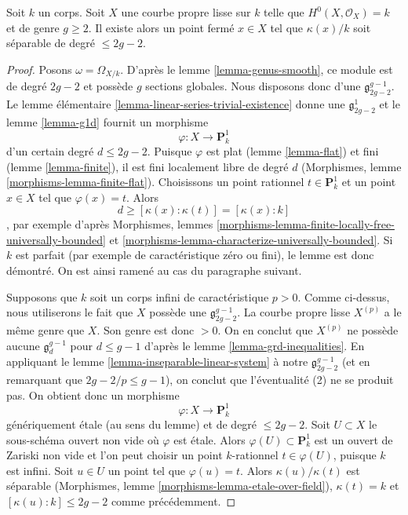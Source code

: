 \begin{lemma}
\label{lemma-point-over-separable-extension}
Soit $k$ un corps. Soit $X$ une courbe propre lisse sur $k$ telle que $H^0(X, \mathcal{O}_X) = k$ et de genre $g \geq 2$. Il existe alors un point fermé $x \in X$ tel que $\kappa(x)/k$ soit séparable de degré $\leq 2g - 2$.
\end{lemma}

\begin{proof}
Posons $\omega = \Omega_{X/k}$. D'après le lemme \ref{lemma-genus-smooth}, ce module est de degré $2g - 2$ et possède $g$ sections globales. Nous disposons donc d'une $\mathfrak g^{g - 1}_{2g - 2}$. Le lemme élémentaire \ref{lemma-linear-series-trivial-existence} donne une $\mathfrak g^1_{2g - 2}$ et le lemme \ref{lemma-g1d} fournit un morphisme $$
\varphi : X \longrightarrow \mathbf{P}^1_k
$$ d'un certain degré $d \leq 2g - 2$. Puisque $\varphi$ est plat (lemme \ref{lemma-flat}) et fini (lemme \ref{lemma-finite}), il est fini localement libre de degré $d$ (Morphismes, lemme \ref{morphisms-lemma-finite-flat}). Choisissons un point rationnel $t \in \mathbf{P}^1_k$ et un point $x \in X$ tel que $\varphi(x) = t$. Alors $$
d \geq [\kappa(x) : \kappa(t)] = [\kappa(x) : k]
$$, par exemple d'après Morphismes, lemmes \ref{morphisms-lemma-finite-locally-free-universally-bounded} et \ref{morphisms-lemma-characterize-universally-bounded}. Si $k$ est parfait (par exemple de caractéristique zéro ou fini), le lemme est donc démontré. On est ainsi ramené au cas du paragraphe suivant.

\medskip\noindent
Supposons que $k$ soit un corps infini de caractéristique $p > 0$. Comme ci-dessus, nous utiliserons le fait que $X$ possède une $\mathfrak g^{g - 1}_{2g - 2}$. La courbe propre lisse $X^{(p)}$ a le même genre que $X$. Son genre est donc $> 0$. On en conclut que $X^{(p)}$ ne possède aucune $\mathfrak g^{g - 1}_d$ pour $d \leq g - 1$ d'après le lemme \ref{lemma-grd-inequalities}. En appliquant le lemme \ref{lemma-inseparable-linear-system} à notre $\mathfrak g^{g - 1}_{2g - 2}$ (et en remarquant que $2g - 2/p \leq g - 1$), on conclut que l'éventualité (2) ne se produit pas. On obtient donc un morphisme $$
\varphi : X \longrightarrow \mathbf{P}^1_k
$$ génériquement \'etale (au sens du lemme) et de degré $\leq 2g - 2$. Soit $U \subset X$ le sous-schéma ouvert non vide où $\varphi$ est \'etale. Alors $\varphi(U) \subset \mathbf{P}^1_k$ est un ouvert de Zariski non vide et l'on peut choisir un point $k$-rationnel $t \in \varphi(U)$, puisque $k$ est infini. Soit $u \in U$ un point tel que $\varphi(u) = t$. Alors $\kappa(u)/\kappa(t)$ est séparable (Morphismes, lemme \ref{morphisms-lemma-etale-over-field}), $\kappa(t) = k$ et $[\kappa(u) : k] \leq 2g - 2$ comme précédemment.
\end{proof}

